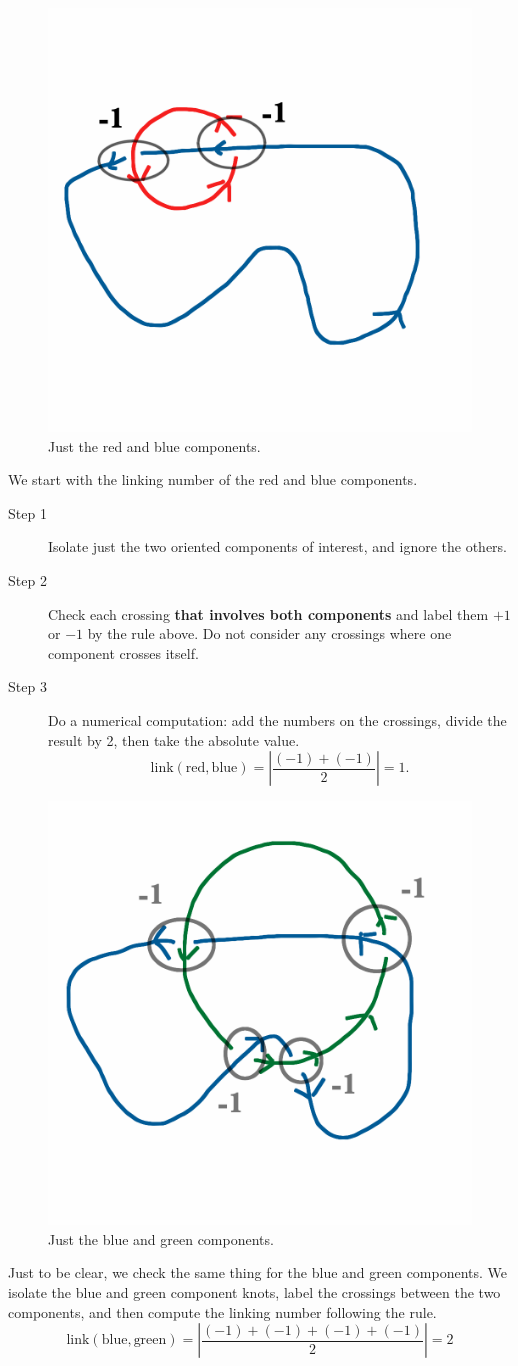 \documentclass[12pt,letterpaper]{article}
\theoremstyle{definition}
\begin{document}
\begin{figure}
    \centering
    \includegraphics[width=.3\textwidth]{rgp11pics/rb.png}
    \caption{Just the red and blue components.}
    \vspace{-60pt}
\end{figure}
We start with the linking number of the red and blue components.
\begin{description}
\item[Step 1] Isolate just the two oriented components of interest, and ignore the others.

\item[Step 2] Check each crossing \textbf{that involves both components} and label them $+1$ or $-1$ by the rule above. Do not consider any crossings where one component crosses itself.
\item[Step 3] Do a numerical computation: add the numbers on the crossings, divide the result by 2, then take the absolute value.
\[ 
\mathrm{link}(\text{red}, \text{blue}) = \left| \dfrac{(-1)+(-1)}{2}\right| = 1.
\]
\end{description}


\begin{figure}
    \centering
    \includegraphics[width=.3\textwidth]{rgp11pics/bg.png}
    \caption{Just the blue and green components.}
\end{figure}

\vspace{1in}

Just to be clear, we check the same thing for the blue and green components.
We isolate the blue and green component knots, label the crossings between the two components, and then compute the linking number following the rule.
\[
\mathrm{link}(\text{blue},\text{green}) = \left| \dfrac{ (-1)+(-1)+(-1)+(-1)}{2}\right| = 2
\]
\end{document}
